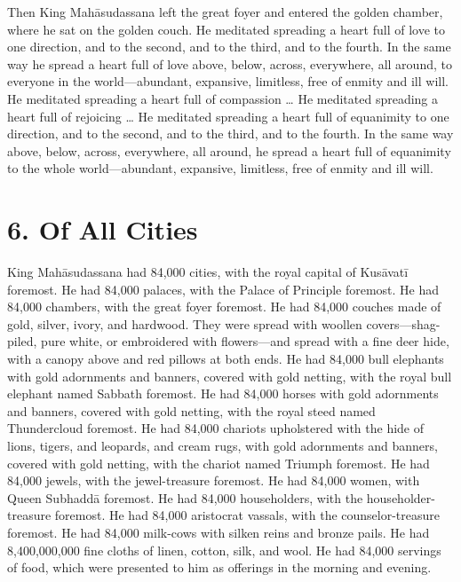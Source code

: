 \documentclass[12pt,openany]{book}%
\begin{document}
Then King \textsanskrit{Mahāsudassana} left the great foyer and entered the golden chamber, where he sat on the golden couch. He meditated spreading a heart full of love to one direction, and to the second, and to the third, and to the fourth. In the same way he spread a heart full of love above, below, across, everywhere, all around, to everyone in the world—abundant, expansive, limitless, free of enmity and ill will. He meditated spreading a heart full of compassion … He meditated spreading a heart full of rejoicing … He meditated spreading a heart full of equanimity to one direction, and to the second, and to the third, and to the fourth. In the same way above, below, across, everywhere, all around, he spread a heart full of equanimity to the whole world—abundant, expansive, limitless, free of enmity and ill will. 

\section*{6. Of All Cities }

King \textsanskrit{Mahāsudassana} had 84,000 cities, with the royal capital of \textsanskrit{Kusāvatī} foremost. He had 84,000 palaces, with the Palace of Principle foremost. He had 84,000 chambers, with the great foyer foremost. He had 84,000 couches made of gold, silver, ivory, and hardwood. They were spread with woollen covers—shag-piled, pure white, or embroidered with flowers—and spread with a fine deer hide, with a canopy above and red pillows at both ends. He had 84,000 bull elephants with gold adornments and banners, covered with gold netting, with the royal bull elephant named Sabbath foremost. He had 84,000 horses with gold adornments and banners, covered with gold netting, with the royal steed named Thundercloud foremost. He had 84,000 chariots upholstered with the hide of lions, tigers, and leopards, and cream rugs, with gold adornments and banners, covered with gold netting, with the chariot named Triumph foremost. He had 84,000 jewels, with the jewel-treasure foremost. He had 84,000 women, with Queen \textsanskrit{Subhaddā} foremost. He had 84,000 householders, with the householder-treasure foremost. He had 84,000 aristocrat vassals, with the counselor-treasure foremost. He had 84,000 milk-cows with silken reins and bronze pails. He had 8,400,000,000 fine cloths of linen, cotton, silk, and wool. He had 84,000 servings of food, which were presented to him as offerings in the morning and evening. 
\end{document}
